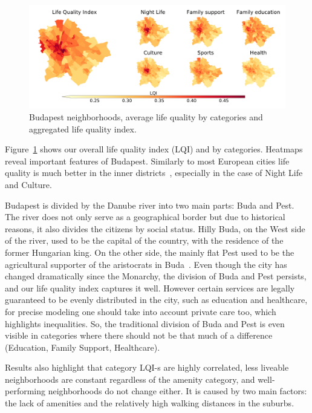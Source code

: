 \begin{figure}[htbp]
	\centering
	\includegraphics[width=\textwidth]{images/lqi/Budapest_LQI_Neighborhoods-eps-converted-to.pdf}
	\caption[Budapest neighborhoods life quality index]{Budapest neighborhoods, average life quality by categories and aggregated life quality index.}
	\label{fig:BPlqi}
\end{figure}

Figure~\ref{fig:BPlqi} shows our overall life quality index (LQI) and by categories. Heatmaps reveal important features of Budapest. Similarly to most European cities life quality is much better in the inner districts~\cite{Hohenberg1996Urban,Brueckner1999Central}, especially in the case of Night Life and Culture.

Budapest is divided by the Danube river into two main parts: Buda and Pest. The river does not only serve as a geographical border but due to historical reasons, it also divides the citizens by social status. Hilly Buda, on the West side of the river, used to be the capital of the country, with the residence of the former Hungarian king. On the other side, the mainly flat Pest used to be the agricultural supporter of the aristocrats in Buda~\cite{Kover2006Magyarorszag}. Even though the city has changed dramatically since the Monarchy, the division of Buda and Pest persists, and our life quality index captures it well. However certain services are legally guaranteed to be evenly distributed in the city, such as education and healthcare, for precise modeling one should take into account private care too, which highlights inequalities. So, the traditional division of Buda and Pest is even visible in categories where there should not be that much of a difference (Education, Family Support, Healthcare).

Results also highlight that category LQI-s are highly correlated, less liveable neighborhoods are constant regardless of the amenity category, and well-performing neighborhoods do not change either. It is caused by two main factors: the lack of amenities and the relatively high walking distances in the suburbs.

